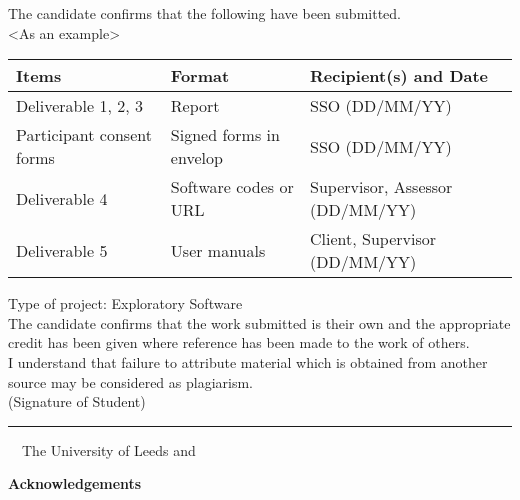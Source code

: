 \frontcover

\clearpage
\noindent The candidate confirms that the following have been submitted.\\
<As an example>
\begin{table}[ht!]
\begin{tabular}{|p{}|p{}|p{}|}
\hline 
Items & Format & Recipient(s) and Date \\ 
\hline 
Deliverable 1, 2, 3 & Report & SSO (DD/MM/YY) \\ 
\hline 
Participant consent forms & Signed forms in envelop & SSO (DD/MM/YY) \\ 
\hline 
Deliverable 4 & Software codes or URL & Supervisor, Assessor (DD/MM/YY) \\ 
\hline 
Deliverable 5 & User manuals & Client, Supervisor (DD/MM/YY) \\ 
\hline 
\end{tabular} 
\end{table}

\noindent Type of project: Exploratory Software
\vspace{\fill}\\
\noindent The candidate confirms that the work submitted is their own and the appropriate credit has been given where reference has been made to the work of others.
\vspace{\fill}\\
\noindent I understand that failure to attribute material which is obtained from another source may be considered as plagiarism.
\vspace{\fill}\\
\flushright(Signature of Student) \rule{50mm}{1pt}
\flushleft
\vspace{\fill}
\textcopyright~\session~The University of Leeds and~\fullname

\begin{dissertationsummary}

\end{dissertationsummary}

\clearpage
\centering\textbf{Acknowledgements}
\flushleft


\tableofcontents


